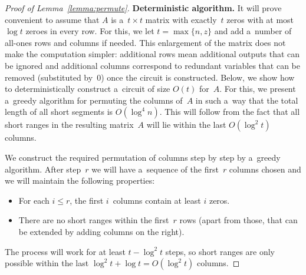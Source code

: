 \begin{proof}[Proof of Lemma~\ref{lemma:permute}]
\textbf{Deterministic algorithm.}
It will prove convenient to assume that $A$ is a~$t \times t$ matrix with
exactly~$t$ zeros with at most $\log t$ zeroes in every row. For this, we let
$t=\max\{n, z\}$ and add a~number of all-ones rows and columns if needed. This
enlargement of the matrix does not make the computation simpler: additional rows
mean additional outputs that can be ignored and additional columns correspond to
redundant variables that can be removed (substituted by~0) once the circuit is
constructed. Below, we show how to deterministically construct a~circuit of size
$O(t)$ for~$A$. For this, we present a~greedy algorithm for permuting the
columns of~$A$ in such a~way that the total length of all short segments
is $O(\log^4n)$. This will follow from the fact that all short ranges in the
resulting matrix~$A$ will lie within the last $O(\log^2 t)$ columns.

We construct the required permutation of columns step by step by a~greedy
algorithm. After step~$r$ we will have a~sequence of the first~$r$ columns
chosen and we will maintain the following properties:
\begin{itemize}
\item For each $i \leq r$, the first $i$~columns contain at least $i$ zeros.
\item There are no short ranges within the first~$r$ rows (apart from those,
that can be extended by adding columns on the right).
\end{itemize}
The process will work for at least $t - \log^2 t$ steps, so short ranges are
only possible within the last $\log^2 t + \log t = O(\log^2 t)$ columns.


\end{proof}
